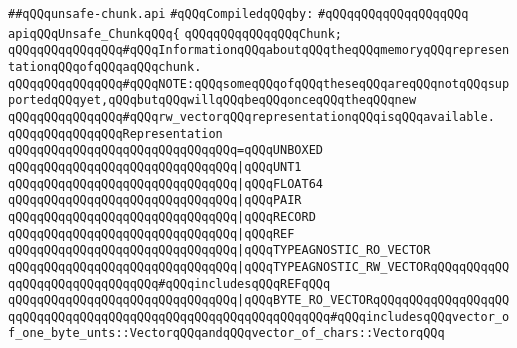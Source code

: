 \label{src/lib/std/src/unsafe/unsafe-chunk.api}
\verb|##qQQqunsafe-chunk.api|\newline
\newline
\verb|#qQQqCompiledqQQqby:|\newline
\verb|#qQQqqQQqqQQqqQQqqQQq|\newline
\newline
\newline
\newline
\verb|apiqQQqUnsafe_ChunkqQQq{|\newline
\newline
\verb|qQQqqQQqqQQqqQQqChunk;|\newline
\newline
\verb|qQQqqQQqqQQqqQQq#qQQqInformationqQQqaboutqQQqtheqQQqmemoryqQQqrepresentationqQQqofqQQqaqQQqchunk.|\newline
\verb|qQQqqQQqqQQqqQQq#qQQqNOTE:qQQqsomeqQQqofqQQqtheseqQQqareqQQqnotqQQqsupportedqQQqyet,qQQqbutqQQqwillqQQqbeqQQqonceqQQqtheqQQqnew|\newline
\verb|qQQqqQQqqQQqqQQq#qQQqrw_vectorqQQqrepresentationqQQqisqQQqavailable.|\newline
\newline
\verb|qQQqqQQqqQQqqQQqRepresentation|\newline
\verb|qQQqqQQqqQQqqQQqqQQqqQQqqQQqqQQq=qQQqUNBOXED|\newline
\verb|qQQqqQQqqQQqqQQqqQQqqQQqqQQqqQQq|\verb#|qQQqUNT1#\newline
\verb|qQQqqQQqqQQqqQQqqQQqqQQqqQQqqQQq|\verb#|qQQqFLOAT64#\newline
\verb|qQQqqQQqqQQqqQQqqQQqqQQqqQQqqQQq|\verb#|qQQqPAIR#\newline
\verb|qQQqqQQqqQQqqQQqqQQqqQQqqQQqqQQq|\verb#|qQQqRECORD#\newline
\verb|qQQqqQQqqQQqqQQqqQQqqQQqqQQqqQQq|\verb#|qQQqREF#\newline
\verb|qQQqqQQqqQQqqQQqqQQqqQQqqQQqqQQq|\verb#|qQQqTYPEAGNOSTIC_RO_VECTOR#\newline
\verb|qQQqqQQqqQQqqQQqqQQqqQQqqQQqqQQq|\verb#|qQQqTYPEAGNOSTIC_RW_VECTORqQQqqQQqqQQqqQQqqQQqqQQqqQQqqQQq#\verb|#qQQqincludesqQQqREFqQQq|\newline
\verb|qQQqqQQqqQQqqQQqqQQqqQQqqQQqqQQq|\verb#|qQQqBYTE_RO_VECTORqQQqqQQqqQQqqQQqqQQqqQQqqQQqqQQqqQQqqQQqqQQqqQQqqQQqqQQqqQQqqQQq#\verb|#qQQqincludesqQQqvector_of_one_byte_unts::VectorqQQqandqQQqvector_of_chars::VectorqQQq|\newline

